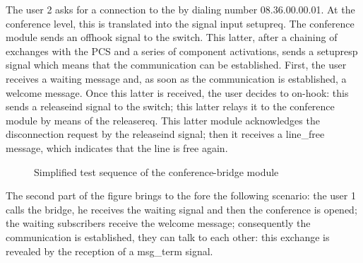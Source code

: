 The user 2 asks for a connection to the \audio by dialing
        number \textsf{08.36.00.00.01}. At the conference level, this is
        translated into the signal input \textsf{setupreq}. The
        conference module sends an \textsf{offhook} signal to the
        switch. This latter, after a chaining of exchanges with the PCS
        and a series of component activations, sends a
        \textsf{setupresp} signal which means that the communication
        can be established. 
	First, the user receives a waiting
        message and, as soon as the communication is established, a
        welcome message. Once this latter is received, the user
        decides to on-hook: this sends a \textsf{releaseind} signal to
        the switch; this latter relays it to the conference module by
        means of the \textsf{releasereq}. This latter module
        acknowledges the disconnection request by the
        \textsf{releaseind} signal; then it receives a
        \textsf{line\_free} message, which indicates that the line is
        free again.

\begin{figure}[h]
\begin{center}
\begin{bigbox}
\end{bigbox}
\caption{Simplified test sequence of the conference-bridge module}
\label{msc}
\end{center}
\end{figure}

        \vspace*{-10mm} The second part of the figure brings to the fore the following
        scenario: the user 1 calls the bridge, he receives the
        waiting signal and then the conference is opened; the waiting
        subscribers receive the welcome message; consequently the
        communication is established, they can talk to each other:
        this exchange is revealed by the reception of a
        \textsf{msg\_term} signal.


